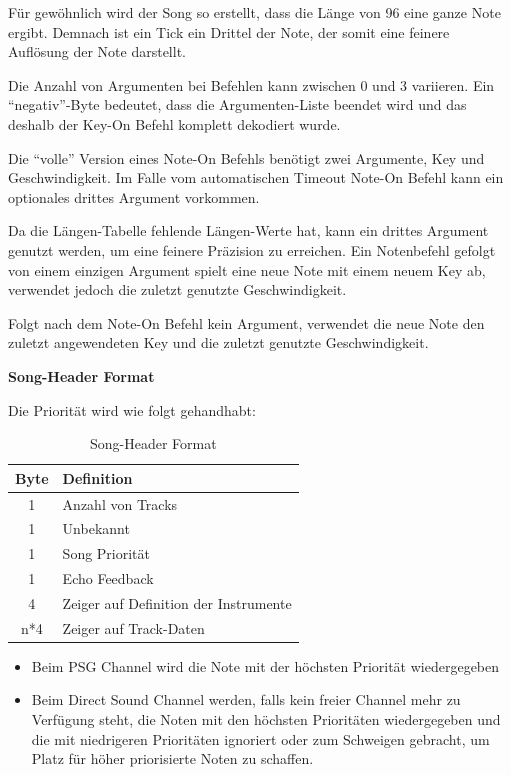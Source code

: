 \documentclass[11pt,a4paper]{scrartcl}
\newcommand{\paratitle}[1] {
    \vspace{5mm}
    \large \textbf{#1} \normalsize
    \vspace{2mm}\newline
}
\begin{document}
F\"ur gew\"ohnlich wird der Song so erstellt, dass die L\"ange von 96 eine ganze Note ergibt. Demnach ist ein Tick ein Drittel der Note, der somit eine feinere Aufl\"osung der Note darstellt.

Die Anzahl von Argumenten bei Befehlen kann zwischen 0 und 3 variieren. Ein \enquote{negativ}-Byte bedeutet, dass die Argumenten-Liste beendet wird und das deshalb der Key-On Befehl komplett dekodiert wurde.

Die \enquote{volle} Version eines Note-On Befehls ben\"otigt zwei Argumente, Key und Geschwindigkeit. Im Falle vom automatischen Timeout Note-On Befehl kann ein optionales drittes Argument vorkommen. 

Da die L\"angen-Tabelle fehlende L\"angen-Werte hat, kann ein drittes Argument genutzt werden, um eine feinere Pr\"azision zu erreichen. Ein Notenbefehl gefolgt von einem einzigen Argument spielt eine neue Note mit einem neuem Key ab, verwendet jedoch die zuletzt genutzte Geschwindigkeit.

Folgt nach dem Note-On Befehl kein Argument, verwendet die neue Note den zuletzt angewendeten Key und die zuletzt genutzte Geschwindigkeit.

\paratitle{Song-Header Format}
Die Priorit\"at wird wie folgt gehandhabt:
\begin{table}[h]
    \centering
    \begin{tabular}{ c | p{8cm} }
        \textbf{Byte} & \textbf{Definition} \\
        \hline
        1 & Anzahl von Tracks \\
        \hline
        1 & Unbekannt \\
        \hline
        1 & Song Priorit\"at \\
        \hline
        1 & Echo Feedback \\
        \hline
        4 & Zeiger auf Definition der Instrumente \\
        \hline
        n*4 & Zeiger auf Track-Daten \\
    \end{tabular}
    \caption{Song-Header Format}
    \label{table:HeaderFormat}
\end{table}

\begin{itemize}
    \item Beim PSG Channel wird die Note mit der h\"ochsten Priorit\"at wiedergegeben
    \item Beim Direct Sound Channel werden, falls kein freier Channel mehr zu Verf\"ugung steht, die Noten mit den h\"ochsten Priorit\"aten wiedergegeben und die mit niedrigeren Priorit\"aten ignoriert oder zum Schweigen gebracht, um Platz f\"ur h\"oher priorisierte Noten zu schaffen.
\end{itemize}
\end{document}

